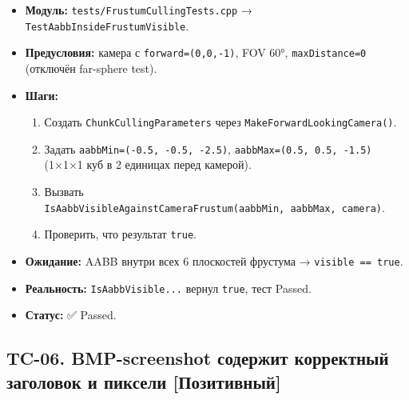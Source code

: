 \documentclass[
  11pt,a4paper,oneside]{article}
\providecommand{\tightlist}{%
  \setlength{\itemsep}{0pt}\setlength{\parskip}{0pt}}
\providecommand{\tightlist}{%
  \setlength{\itemsep}{0pt}\setlength{\parskip}{0pt}}
\begin{document}
\begin{itemize}
\tightlist
\item
  \textbf{Модуль:} \texttt{tests/FrustumCullingTests.cpp} → \texttt{TestAabbInsideFrustumVisible}.
\item
  \textbf{Предусловия:} камера с \texttt{forward=(0,0,-1)}, FOV 60°, \texttt{maxDistance=0} (отключён far-sphere test).
\item
  \textbf{Шаги:}

  \begin{enumerate}
  \def\labelenumi{\arabic{enumi}.}
  \tightlist
  \item
    Создать \texttt{ChunkCullingParameters} через \texttt{MakeForwardLookingCamera()}.
  \item
    Задать \texttt{aabbMin=(-0.5,\ -0.5,\ -2.5)}, \texttt{aabbMax=(0.5,\ 0.5,\ -1.5)} (1×1×1 куб в 2 единицах перед камерой).
  \item
    Вызвать \texttt{IsAabbVisibleAgainstCameraFrustum(aabbMin,\ aabbMax,\ camera)}.
  \item
    Проверить, что результат \texttt{true}.
  \end{enumerate}
\item
  \textbf{Ожидание:} AABB внутри всех 6 плоскостей фрустума → \texttt{visible\ ==\ true}.
\item
  \textbf{Реальность:} \texttt{IsAabbVisible...} вернул \texttt{true}, тест Passed.
\item
  \textbf{Статус:} ✅ Passed.
\end{itemize}

\subsection{TC-06. BMP-screenshot содержит корректный заголовок и пиксели {[}Позитивный{]}}\label{tc-06-bmp-screenshot-ux441ux43eux434ux435ux440ux436ux438ux442-ux43aux43eux440ux440ux435ux43aux442ux43dux44bux439-ux437ux430ux433ux43eux43bux43eux432ux43eux43a-ux438-ux43fux438ux43aux441ux435ux43bux438-ux43fux43eux437ux438ux442ux438ux432ux43dux44bux439}
\end{document}
